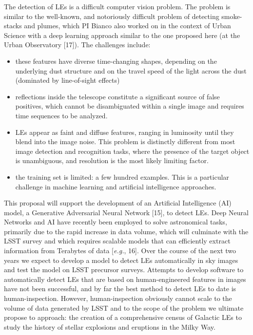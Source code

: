 \documentclass{proposalnsf}
\newcommand{\eg}{\emph{e.g.}}
\begin{document}
The detection of LEs is a difficult computer vision problem.   The problem is similar to the well-known, and notoriously difficult problem of detecting smoke-stacks and plumes, which PI Bianco also worked on in the context of Urban Science with a deep learning approach similar to the one proposed here (at the Urban Observatory [17]).  
The challenges include:
\begin{itemize}
  \item these features have diverse time-changing shapes, depending on the underlying dust structure and on the travel speed of the light across the dust (dominated by line-of-sight effects)
  \item reflections inside the telescope constitute a significant source of false positives, which cannot be disambiguated within a single image and requires time sequences to be analyzed.
  \item LEs appear as faint and diffuse features, ranging in luminosity until they blend into the image noise.   This problem is distinctly different from most image detection and recognition tasks, where the presence of the target object is unambiguous, and resolution is the most likely limiting factor.   
  \item the training set is limited: a few hundred examples.   This is a particular challenge in machine learning and artificial intelligence approaches.  


\end{itemize}
This proposal will support the development of an Artificial Intelligence (AI) model, a Generative Adversarial Neural Network [15], to detect LEs.   Deep Neural Networks and AI have recently been employed to solve astronomical tasks, primarily due to the rapid increase in data volume, which will culminate with the LSST survey and which requires scalable models that can efficiently extract information from Terabytes of data [\eg,  16].   Over the course of the next two years we expect to develop a model to detect LEs automatically in sky images and test the model on LSST precursor surveys.   Attempts to develop software to automatically detect LEs that are based on human-engineered features in images have not been successful, and by far the best method to detect LEs to date is human-inspection.  However, human-inspection obviously cannot scale to the volume of data generated by LSST and to the scope of the problem we ultimate propose to approach: the creation of a comprehensive census of Galactic LEs to study the history of stellar explosions and eruptions in the Milky Way.   
\end{document}
